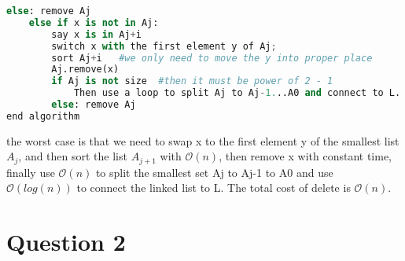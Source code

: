 \documentclass[10pt]{article}
\begin{document}
\begin{itemize}
\begin{lstlisting}[language=Python]
		else: remove Aj
	else if x is not in Aj:
		say x is in Aj+i
		switch x with the first element y of Aj;
		sort Aj+i   #we only need to move the y into proper place
		Aj.remove(x)
		if Aj is not size  #then it must be power of 2 - 1
			Then use a loop to split Aj to Aj-1...A0 and connect to L.
		else: remove Aj
end algorithm
\end{lstlisting}
the worst case is that we need to swap x to the first element y of the smallest list $A_j$, and then sort the list $A_{j+1}$ with $\mathcal{O}(n)$, then remove x with constant time, finally use $\mathcal{O}(n)$ to split the smallest set  Aj to Aj-1 to A0 and use $\mathcal{O}(log(n))$ to connect the linked list to L. The total cost of delete is $\mathcal{O}(n)$.
\end{itemize}

\newpage
\section*{Question 2}
\end{document}
